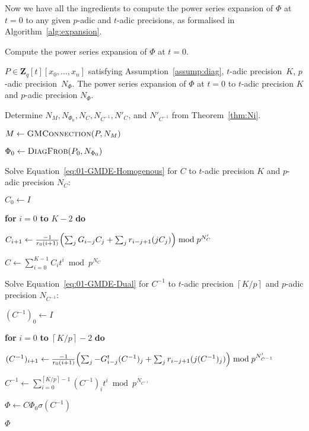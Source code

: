 \documentclass[a4paper,11pt]{article}
\numberwithin{equation}{section}
\providecommand{\ceil}[1]{\left\lceil#1\right\rceil}   %
\newcommand{\ZZ}{\mathbf{Z}} %
\theoremstyle{definition}
\begin{document}
Now we have all the ingredients to compute the power series expansion of 
$\Phi$ at $t=0$ to any given $p$-adic and $t$-adic precisions, as formalised 
in Algorithm~\ref{alg:expansion}.

\begin{algorithm}
\caption{Compute the power series expansion of $\Phi$ at $t=0$.}
\label{alg:expansion}
\begin{algorithmic}
\vspace{1mm}
\Require $P \in \ZZ_q[t][x_0,\dotsc,x_n]$ satisfying Assumption~\ref{assump:diag}, $t$-adic precision~$K$, $p$-adic precision~$N_{\Phi}$.
\Ensure  The power series expansion of $\Phi$ at $t=0$ to $t$-adic precision $K$ and $p$-adic precision $N_{\Phi}$.
\State \begin{compactenum}[{\hspace{6pt}} 1.] \vspace{-1.24em}
\item Determine $N_M,N_{\Phi_0},N_C,N_{C^{-1}},N'_C$, and $N'_{C^{-1}}$ from Theorem~\ref{thm:Ni}.
\item $M \gets \textsc{GMConnection}(P,N_M)$
\item $\Phi_0 \gets \textsc{DiagFrob}(P_0,N_{\Phi_0})$
\item Solve Equation~\eqref{eq:01-GMDE-Homogenous} for $C$ to $t$-adic precision $K$ and $p$-adic precision $N_{C}$:
\begin{compactenum}[a.] 
\item[] $C_0 \gets I$
\item[] \textbf{for} $i=0$ \textbf{to} $K-2$ \textbf{do} 
\item[] \hspace{0.6em} $C_{i+1} \gets \frac{-1}{r_0 (i+1)} \Bigl(\sum_j G_{i-j} C_j + \sum_j r_{i-j+1} (j C_j) \Bigr) \bmod{p^{N'_C}}$
\item[] $C \gets \sum_{i=0}^{K-1} C_i t^i \bmod{p^{N_C}}$
\end{compactenum}
\item Solve Equation~\eqref{eq:01-GMDE-Dual} for $C^{-1}$ to $t$-adic precision $\ceil{K/p}$ and $p$-adic precision $N_{C^{-1}}$:
\begin{compactenum}[a.]
\item[] $(C^{-1})_0 \gets I$
\item[] \textbf{for} $i=0$ \textbf{to} $\ceil{K/p}-2$ \textbf{do}
\item[] \hspace{0.6em} $(C^{-1})_{i+1} \gets  \frac{-1}{r_0(i+1)} \Bigl(\sum_j -G_{i-j}^t (C^{-1})_j + \sum_j r_{i-j+1} (j (C^{-1})_j) \Bigr) \bmod{p^{N'_{C^{-1}}}}$
\item[] $C^{-1} \gets \sum_{i=0}^{\ceil{K/p}-1} (C^{-1})_i t^{i} \bmod{p^{N_{C^{-1}}}}$
\end{compactenum}
\item $\Phi \gets C \Phi_0 \sigma(C^{-1})$
\item \Return $\Phi$
\end{compactenum}
\EndProcedure
\end{algorithmic}
\end{algorithm}
\end{document}
